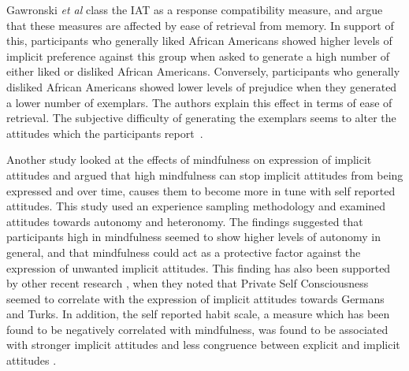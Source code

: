 Gawronski \textit{et al} class the IAT as a response compatibility measure, and argue that these measures are affected by ease of retrieval from memory. In support of this, participants who generally liked African Americans showed higher levels of implicit preference against this group when asked to generate a high number of either liked or disliked African Americans. Conversely, participants who generally disliked African Americans showed lower levels of prejudice when they generated a lower number of exemplars. The authors explain this effect in terms of ease of retrieval. The subjective difficulty of generating the exemplars seems to alter the attitudes which the participants report~\cite{Kahneman2002}.




Another study \cite{Levesque2007} looked at the effects of mindfulness on expression of implicit attitudes and argued that high mindfulness can stop implicit attitudes from being expressed and over time, causes them to become more in tune with self reported attitudes. This study used an experience sampling methodology and examined attitudes towards autonomy and heteronomy. The findings suggested that participants high in mindfulness seemed to show higher levels of autonomy in general, and that mindfulness could act as a protective factor against the expression of unwanted implicit attitudes.  This finding has also been supported by other recent research \cite{Gschwendner2006}, when they noted that Private Self Consciousness seemed to correlate with the expression of implicit attitudes towards Germans and Turks. In addition, the self reported habit scale, a measure which has been found to be negatively correlated with mindfulness, was found to be associated with stronger implicit attitudes and less congruence between explicit and implicit attitudes \cite{Conner2007}. 





